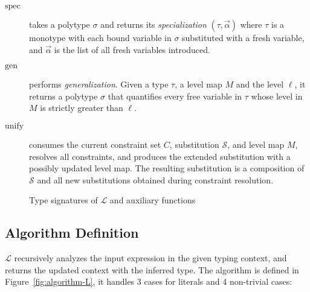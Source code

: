 \begin{description}
  \item[$\mathrm{spec}$] takes a polytype $\sigma$ and returns its \emph{specialization} $(\tau,\vec{\alpha})$ where $\tau$ is a monotype with each bound variable in $\sigma$ substituted with a fresh variable, and $\vec{\alpha}$ is the list of all fresh variables introduced.
  \item[$\mathrm{gen}$] performs \emph{generalization}.  Given a type $\tau$, a level map $M$ and the level $\ell$, it returns a polytype $\sigma$ that quantifies every free variable in $\tau$ whose level in $M$ is strictly greater than $\ell$.
  \item[$\mathrm{unify}$] consumes the current constraint set $C$, substitution $\mathcal{S}$, and level map $M$, resolves all constraints, and produces the extended substitution with a possibly updated level map. The resulting substitution is a composition of $\mathcal{S}$ and all new substitutions obtained during constraint resolution.
\end{description}

\begin{figure}[H]
  \centering
  \caption{Type signatures of $\mathcal{L}$ and auxiliary functions}
  \label{fig:algorithm-L-types}
\end{figure}

\subsection{Algorithm Definition}

$\mathcal{L}$ recursively analyzes the input expression in the given typing context, and returns the updated context with the inferred type. The algorithm is defined in Figure~\ref{fig:algorithm-L}, it handles 3 cases for literals and 4 non-trivial cases:

